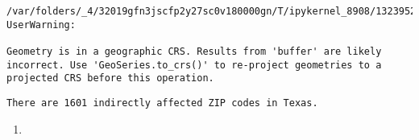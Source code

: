 \documentclass[
  letterpaper,
  DIV=11,
  numbers=noendperiod]{scrartcl}
\providecommand{\tightlist}{%
  \setlength{\itemsep}{0pt}\setlength{\parskip}{0pt}}\usepackage{longtable,booktabs,array}
\begin{document}
\begin{verbatim}
/var/folders/_4/32019gfn3jscfp2y27sc0v180000gn/T/ipykernel_8908/1323952495.py:12: UserWarning:

Geometry is in a geographic CRS. Results from 'buffer' are likely incorrect. Use 'GeoSeries.to_crs()' to re-project geometries to a projected CRS before this operation.

\end{verbatim}

\begin{verbatim}
There are 1601 indirectly affected ZIP codes in Texas.
\end{verbatim}

\begin{enumerate}
\def\labelenumi{\arabic{enumi}.}
\setcounter{enumi}{3}
\tightlist
\item
\end{enumerate}
\end{document}
